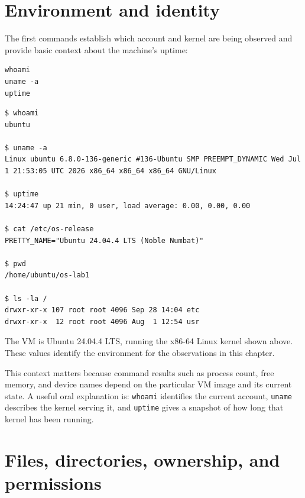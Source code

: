 \documentclass{assets/utmreport}
\begin{document}
\section{Environment and identity}

The first commands establish which account and kernel are being observed and provide basic context about the machine's uptime:

\noindent\begin{minipage}{\linewidth}
\begin{lstlisting}[caption={Initial Linux environment check}]
whoami
uname -a
uptime
\end{lstlisting}
\end{minipage}\par


\noindent\begin{minipage}{\linewidth}
\begin{lstlisting}[caption={Observed lab VM identity and kernel}]
$ whoami
ubuntu

$ uname -a
Linux ubuntu 6.8.0-136-generic #136-Ubuntu SMP PREEMPT_DYNAMIC Wed Jul 1 21:53:05 UTC 2026 x86_64 x86_64 x86_64 GNU/Linux

$ uptime
14:24:47 up 21 min, 0 user, load average: 0.00, 0.00, 0.00

$ cat /etc/os-release
PRETTY_NAME="Ubuntu 24.04.4 LTS (Noble Numbat)"

$ pwd
/home/ubuntu/os-lab1

$ ls -la /
drwxr-xr-x 107 root root 4096 Sep 28 14:04 etc
drwxr-xr-x  12 root root 4096 Aug  1 12:54 usr
\end{lstlisting}
\end{minipage}\par


The VM is Ubuntu 24.04.4 LTS, running the x86-64 Linux kernel shown above. These values identify the environment for the observations in this chapter.

This context matters because command results such as process count, free memory, and device names depend on the particular VM image and its current state. A useful oral explanation is: \texttt{whoami} identifies the current account, \texttt{uname} describes the kernel serving it, and \texttt{uptime} gives a snapshot of how long that kernel has been running.

\section{Files, directories, ownership, and permissions}
\end{document}
